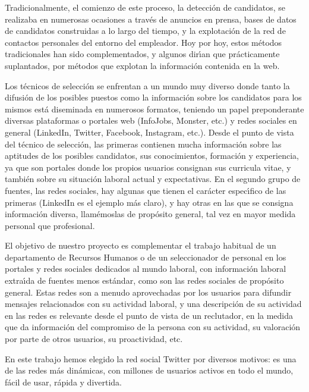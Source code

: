 Tradicionalmente, el comienzo de este proceso, la detecci\'on de candidatos, se realizaba en numerosas ocasiones 
a trav\'es de anuncios en prensa,
bases de datos de candidatos construidas a lo largo del tiempo, y la explotaci\'on de la red de contactos personales del entorno 
del empleador. Hoy por hoy, estos m\'etodos tradicionales han sido complementados, y algunos dir\'\i an que pr\'acticamente
suplantados, por m\'etodos que explotan la informaci\'on contenida en la web. 

Los t\'ecnicos de selecci\'on se enfrentan a un mundo muy diverso donde tanto la difusi\'on de los 
posibles puestos como la informaci\'on sobre los candidatos para los mismos est\'a diseminada en numerosos
formatos, teniendo un papel preponderante diversas plataformas o portales web (InfoJobs, Monster, etc.)
y redes sociales en general (LinkedIn, Twitter, Facebook, Instagram, etc.). Desde el punto de vista del t\'ecnico de selecci\'on, las
primeras contienen mucha informaci\'on sobre las aptitudes de los posibles candidatos, sus conocimientos, formaci\'on y 
experiencia, ya que son portales donde los propios usuarios consignan sus curricula vitae, y tambi\'en sobre su situaci\'on laboral
actual y expectativas. En el segundo grupo de fuentes, las redes sociales, hay algunas que tienen el car\'acter espec\'\i fico 
de las primeras (LinkedIn es el ejemplo m\'as claro), y hay otras en las que se consigna informaci\'on diversa, llam\'emoslas de 
prop\'osito general, tal vez en mayor medida personal que profesional.

El objetivo de nuestro proyecto es complementar el 
trabajo habitual de un departamento de Recursos Humanos o de un seleccionador de personal en
los portales y redes sociales dedicados al mundo laboral, con informaci\'on laboral extra\'\i da 
de fuentes menos est\'andar, como son las redes sociales de prop\'osito general. 
Estas redes son a menudo aprovechadas por los usuarios para difundir mensajes relacionados con su actividad
laboral, y una descripción de su actividad en las redes es relevante desde el punto de vista 
de un reclutador, en la medida que da informaci\'on del compromiso de la persona con su actividad, su valoración por
parte de otros usuarios, su proactividad, etc.

En este trabajo hemos elegido la red social Twitter por diversos motivos: es una de las redes más dinámicas,
con millones de usuarios activos en todo el mundo, fácil de usar, rápida y divertida. 




